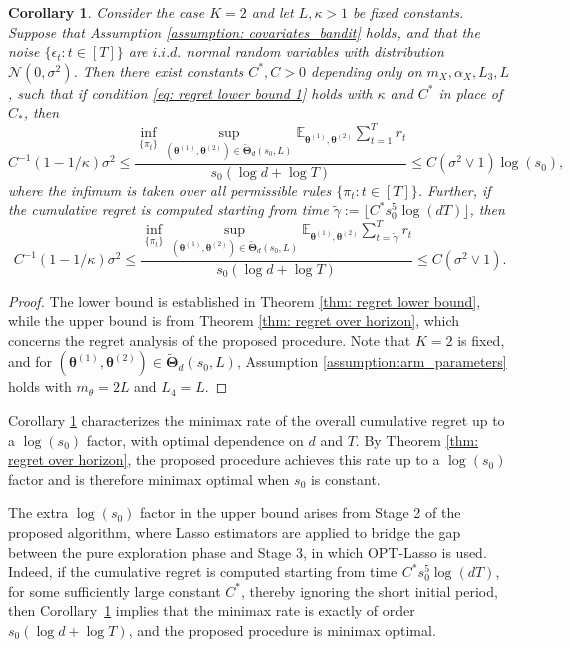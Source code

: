 \documentclass[aos,preprint]{imsart}
\theoremstyle{plain}
\newtheorem{corollary}[theorem]{Corollary}
\theoremstyle{definition}
\newcommand{\bTheta}{\boldsymbol{\Theta}}
\newcommand{\btheta}{\boldsymbol{\theta}}
\newcommand{\Exp}{\mathbb{E}}
\begin{document}
\begin{corollary}\label{cor:bandit_minimax_rate}
Consider the case $K=2$ and let $L, \kappa > 1$ be fixed constants. Suppose that Assumption \ref{assumption: covariates_bandit} holds, and  that the noise $\{\epsilon_t:t\in[T]\}$ are $i.i.d.$ normal random variables with distribution $\mathcal{N}(0,\sigma^2)$. 
Then there exist constants $C^*,C>0$ depending only on $m_X, \alpha_X,  L_3, L$, such that 
if condition \eqref{eq: regret lower bound 1} holds with $\kappa$ and $C^*$ in place of $C_*$, then
$$
C^{-1} (1-1/\kappa)\sigma^2 \leq \frac{\inf_{\{\pi_t\}}\sup_{(\btheta^{(1)}, \btheta^{(2)}) \in \widetilde{\bTheta}_{d}(s_0,L)}  \Exp_{\btheta^{(1)}, \btheta^{(2)}} \sum_{t=1}^T r_t }{ s_0 \left(\log d + \log T \right)}
 \leq  C (\sigma^2 \vee 1) \log(s_0),$$
 where the infimum is taken over all permissible rules $\{\pi_t:t \in [T]\}$. Further, if the cumulative regret is computed starting from time $\tilde{\gamma} := \lfloor C^* s_0^5\log(dT)\rfloor$, then
 $$
C^{-1} (1-1/\kappa)\sigma^2 \leq \frac{\inf_{\{\pi_t\}}\sup_{(\btheta^{(1)}, \btheta^{(2)}) \in \widetilde{\bTheta}_{d}(s_0,L)}  \Exp_{\btheta^{(1)}, \btheta^{(2)}} \sum_{t=\tilde{\gamma}}^T r_t  }{ s_0 \left(\log d + \log T \right)}
 \leq  C (\sigma^2 \vee 1).$$
\end{corollary}
\begin{proof}
    The lower bound is established in Theorem \ref{thm: regret lower bound}, while the upper bound is from Theorem \ref{thm: regret over horizon}, which concerns the regret analysis of the proposed procedure. Note that $K=2$ is fixed, and for $(\btheta^{(1)}, \btheta^{(2)}) \in \widetilde{\bTheta}_{d}(s_0,L)$, Assumption \ref{assumption:arm_parameters} holds with $m_{\theta} = 2L$ and $L_4 = L$.
\end{proof}

Corollary \ref{cor:bandit_minimax_rate} characterizes the minimax rate of the overall cumulative regret up to a $\log(s_0)$ factor, with optimal dependence on $d$ and $T$. By Theorem \ref{thm: regret over horizon}, the proposed procedure achieves this rate up to a $\log(s_0)$ factor and is therefore minimax optimal when $s_0$ is constant. 

The extra $\log(s_0)$ factor in the upper bound arises from Stage 2 of the proposed algorithm, where Lasso estimators are applied to bridge the gap between the pure exploration phase and Stage 3, in which OPT-Lasso is used. Indeed, if the cumulative regret is computed starting from time $C^* s_0^5 \log(dT)$, for some sufficiently large constant $C^*$, thereby ignoring the short initial period, then Corollary~\ref{cor:bandit_minimax_rate} implies that the minimax rate is exactly of order $s_0(\log d + \log T)$, and the proposed procedure is minimax optimal.
\end{document}
